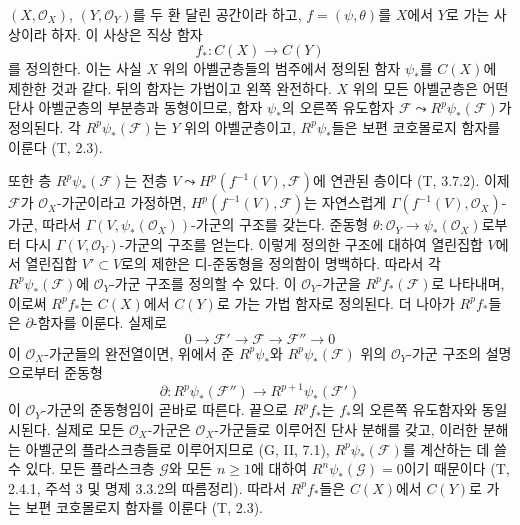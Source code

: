 \begin{env}[12.2.1]
\label{0.12.2.1-fr}
$(X,\mathcal O_X)$, $(Y,\mathcal O_Y)$를 두 환 달린 공간이라 하고,
$f=(\psi,\theta)$를 $X$에서 $Y$로 가는 사상이라 하자. 이 사상은
직상 함자
\[
f_*:C(X)\longrightarrow C(Y)
\]
를 정의한다. 이는 사실 $X$ 위의 아벨군층들의 범주에서 정의된 함자
$\psi_*$를 $C(X)$에 제한한 것과 같다. 뒤의 함자는 가법이고 왼쪽
완전하다. $X$ 위의 모든 아벨군층은 어떤 단사 아벨군층의 부분층과
동형이므로, 함자 $\psi_*$의 오른쪽 유도함자
$\mathcal F\leadsto R^p\psi_*(\mathcal F)$가 정의된다. 각
$R^p\psi_*(\mathcal F)$는 $Y$ 위의 아벨군층이고, $R^p\psi_*$들은
보편 코호몰로지 함자를 이룬다 (T, 2.3).

또한 층 $R^p\psi_*(\mathcal F)$는 전층
$V\leadsto H^p(f^{-1}(V),\mathcal F)$에 연관된 층이다 (T, 3.7.2).
이제 $\mathcal F$가 $\mathcal O_X$-가군이라고 가정하면,
$H^p(f^{-1}(V),\mathcal F)$는 자연스럽게
$\Gamma(f^{-1}(V),\mathcal O_X)$-가군, 따라서
$\Gamma(V,\psi_*(\mathcal O_X))$-가군의 구조를 갖는다. 준동형
$\theta:\mathcal O_Y\to\psi_*(\mathcal O_X)$로부터 다시
$\Gamma(V,\mathcal O_Y)$-가군의 구조를 얻는다. 이렇게 정의한 구조에
대하여 열린집합 $V$에서 열린집합 $V'\subset V$로의 제한은
디-준동형을 정의함이 명백하다. 따라서 각 $R^p\psi_*(\mathcal F)$에
$\mathcal O_Y$-가군 구조를 정의할 수 있다. 이 $\mathcal O_Y$-가군을
$R^p f_*(\mathcal F)$로 나타내며, 이로써 $R^p f_*$는 $C(X)$에서
$C(Y)$로 가는 가법 함자로 정의된다. 더 나아가 $R^p f_*$들은
$\partial$-함자를 이룬다. 실제로
\[
0\longrightarrow\mathcal F'\longrightarrow\mathcal F
\longrightarrow\mathcal F''\longrightarrow0
\]
이 $\mathcal O_X$-가군들의 완전열이면, 위에서 준
$R^p\psi_*$와 $R^p\psi_*(\mathcal F)$ 위의 $\mathcal O_Y$-가군
구조의 설명으로부터 준동형
\[
\partial:R^p\psi_*(\mathcal F'')\longrightarrow
R^{p+1}\psi_*(\mathcal F')
\]
이 $\mathcal O_Y$-가군의 준동형임이 곧바로 따른다. 끝으로
$R^p f_*$는 $f_*$의 오른쪽 유도함자와 동일시된다. 실제로 모든
$\mathcal O_X$-가군은 $\mathcal O_X$-가군들로 이루어진 단사 분해를
갖고, 이러한 분해는 아벨군의 플라스크층들로 이루어지므로
(G, II, 7.1), $R^p\psi_*(\mathcal F)$를 계산하는 데 쓸 수 있다.
모든 플라스크층 $\mathcal G$와 모든 $n\geq1$에 대하여
$R^n\psi_*(\mathcal G)=0$이기 때문이다 (T, 2.4.1, 주석 3 및 명제
3.3.2의 따름정리). 따라서 $R^p f_*$들은 $C(X)$에서 $C(Y)$로 가는
보편 코호몰로지 함자를 이룬다 (T, 2.3).
\end{env}

